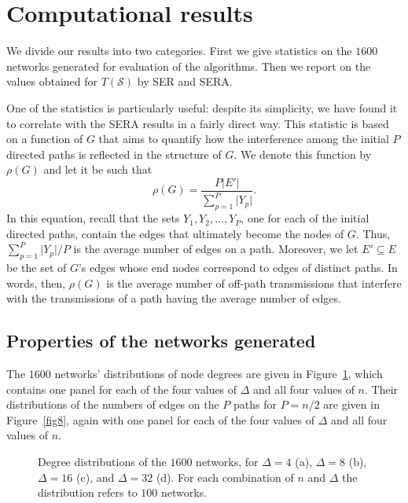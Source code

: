 \documentclass{article}
\begin{document}
\section{Computational results}\label{sec:results}

We divide our results into two categories. First we give statistics on the
$1600$ networks generated for evaluation of the algorithms. Then we report on
the values obtained for $T(\mathcal{S})$ by SER and SERA.

One of the statistics is particularly useful: despite its simplicity, we have
found it to correlate with the SERA results in a fairly direct way. This
statistic is based on a function of $G$ that aims to quantify how the
interference among the initial $P$ directed paths is reflected in the structure
of $G$. We denote this function by $\rho(G)$ and let it be such that
\begin{equation}
\rho(G)=\frac{P\vert E'\vert}{\sum_{p=1}^P\vert Y_p\vert}.
\end{equation}
In this equation, recall that the sets $Y_1,Y_2,\ldots,Y_P$, one for each of the
initial directed paths, contain the edges that ultimately become the nodes of
$G$. Thus, $\sum_{p=1}^P\vert Y_p\vert/P$ is the average number of edges on a
path. Moreover, we let $E'\subseteq E$ be the set of $G$'s edges whose end nodes
correspond to edges of distinct paths. In words, then, $\rho(G)$ is the average
number of off-path transmissions that interfere with the transmissions of a path
having the average number of edges.

\subsection{Properties of the networks generated}

The $1600$ networks' distributions of node degrees are given in
Figure~\ref{fig7}, which contains one panel for each of the four values of
$\Delta$ and all four values of $n$. Their distributions of the numbers of edges
on the $P$ paths for $P=n/2$ are given in Figure~\ref{fig8}, again with one
panel for each of the four values of $\Delta$ and all four values of $n$.

\begin{figure}[p]
\centering
{}
\caption{Degree distributions of the $1600$ networks, for $\Delta=4$ (a),
$\Delta=8$ (b), $\Delta=16$ (c), and $\Delta=32$ (d). For each combination of
$n$ and $\Delta$ the distribution refers to $100$ networks.}
\label{fig7}
\end{figure}
\end{document}
